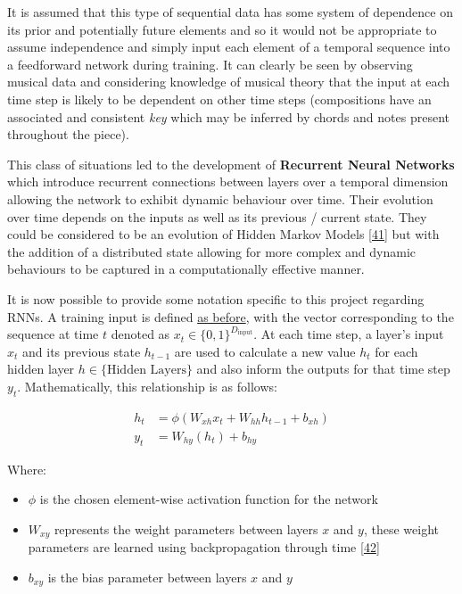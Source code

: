 \documentclass[12pt,]{article}
\providecommand{\tightlist}{%
  \setlength{\itemsep}{0pt}\setlength{\parskip}{0pt}}
\begin{document}
It is assumed that this type of sequential data has some system of
dependence on its prior and potentially future elements and so it would
not be appropriate to assume independence and simply input each element
of a temporal sequence into a feedforward network during training. It
can clearly be seen by observing musical data and considering knowledge
of musical theory that the input at each time step is likely to be
dependent on other time steps (compositions have an associated and
consistent \emph{key} which may be inferred by chords and notes present
throughout the piece).

This class of situations led to the development of \textbf{Recurrent
Neural Networks} which introduce recurrent connections between layers
over a temporal dimension allowing the network to exhibit dynamic
behaviour over time. Their evolution over time depends on the inputs as
well as its previous / current state. They could be considered to be an
evolution of Hidden Markov Models
{[}\protect\hyperlink{ref-baum1966}{41}{]} but with the addition of a
distributed state allowing for more complex and dynamic behaviours to be
captured in a computationally effective manner.

It is now possible to provide some notation specific to this project
regarding RNNs. A training input is defined
\protect\hyperlink{buildinganeffectiverepresentation}{as before}, with
the vector corresponding to the sequence at time \(t\) denoted as
\(x_t\in \{0,1\}^{D_{\text{input}}}\). At each time step, a layer's
input \(x_t\) and its previous state \(h_{t-1}\) are used to calculate a
new value \(h_t\) for each hidden layer \(h\in\{\text{Hidden Layers}\}\)
and also inform the outputs for that time step \(y_t\). Mathematically,
this relationship is as follows:

\[\begin{aligned}
h_t &= \phi(W_{xh} x_t + W_{hh} h_{t-1} + b_{xh}) \\
y_t &= W_{hy}(h_t) + b_{hy}
\end{aligned}\]

Where:

\begin{itemize}
\tightlist
\item
  \(\phi\) is the chosen element-wise activation function for the
  network
\item
  \(W_{xy}\) represents the weight parameters between layers \(x\) and
  \(y\), these weight parameters are learned using backpropagation
  through time
  {[}\protect\hyperlink{ref-werbos1990backpropagation}{42}{]}
\item
  \(b_{xy}\) is the bias parameter between layers \(x\) and \(y\)
\end{itemize}
\end{document}
